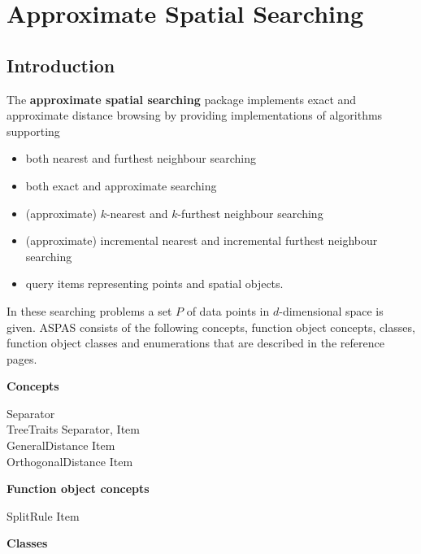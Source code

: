 \chapter{Approximate Spatial Searching}

\section{Introduction}


The {\bf approximate spatial searching} package implements
exact and approximate distance browsing
by providing implementations of algorithms supporting

\begin{itemize} 

\item
both nearest and furthest neighbour searching

\item
both exact and approximate searching

\item 
(approximate) $k$-nearest and $k$-furthest neighbour searching

\item 
(approximate) incremental nearest and incremental furthest neighbour searching

\item
query items representing points and spatial objects.

\end{itemize}

In these searching problems a set $P$ of data points in $d$-dimensional
space is given.
ASPAS consists of the following concepts, function object concepts, classes, function object classes
and enumerations that are described in the reference pages.

{\bf Concepts}

Separator \\
TreeTraits \ccOpenAngle Separator, Item\ccCloseAngle \\
GeneralDistance \ccOpenAngle Item\ccCloseAngle \\
OrthogonalDistance \ccOpenAngle Item\ccCloseAngle

{\bf Function object concepts}

SplitRule \ccOpenAngle Item\ccCloseAngle

{\bf Classes}

